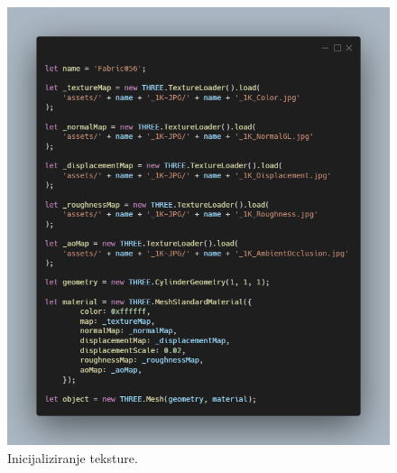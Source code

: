 \documentclass[a4paper,12pt]{article}
\begin{document}
\pagebreak
\begin{figure}[ht]
    \centering
    \includegraphics[scale=0.5]{image/zadatak7.png}
    \caption{Inicijaliziranje teksture.}
\end{figure}
\end{document}
